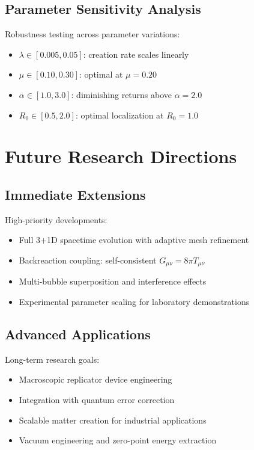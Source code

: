\documentclass[11pt]{article}
\begin{document}
\subsection{Parameter Sensitivity Analysis}

Robustness testing across parameter variations:
\begin{itemize}
\item $\lambda \in [0.005, 0.05]$: creation rate scales linearly
\item $\mu \in [0.10, 0.30]$: optimal at $\mu = 0.20$
\item $\alpha \in [1.0, 3.0]$: diminishing returns above $\alpha = 2.0$
\item $R_0 \in [0.5, 2.0]$: optimal localization at $R_0 = 1.0$
\end{itemize}

\section{Future Research Directions}

\subsection{Immediate Extensions}

High-priority developments:
\begin{itemize}
\item Full 3+1D spacetime evolution with adaptive mesh refinement
\item Backreaction coupling: self-consistent $G_{\mu\nu} = 8\pi T_{\mu\nu}$
\item Multi-bubble superposition and interference effects
\item Experimental parameter scaling for laboratory demonstrations
\end{itemize}

\subsection{Advanced Applications}

Long-term research goals:
\begin{itemize}
\item Macroscopic replicator device engineering
\item Integration with quantum error correction
\item Scalable matter creation for industrial applications
\item Vacuum engineering and zero-point energy extraction
\end{itemize}
\end{document}

